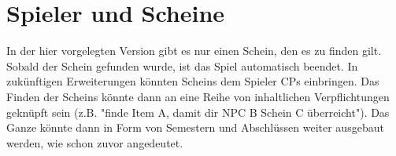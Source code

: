 \section{Spieler und Scheine}
In der hier vorgelegten Version gibt es nur einen Schein, den es zu finden gilt. Sobald der Schein gefunden
wurde, ist das Spiel automatisch beendet. In zukünftigen Erweiterungen könnten \glspl{Schein} dem 
\gls{Spieler} CPs einbringen. Das Finden der \glspl{Schein} könnte dann an eine Reihe von inhaltlichen
Verpflichtungen geknüpft sein (z.B. "finde \gls{Item} A, damit dir NPC B Schein C überreicht"). Das Ganze
könnte dann in Form von Semestern und Abschlüssen weiter ausgebaut werden, wie schon zuvor angedeutet.

